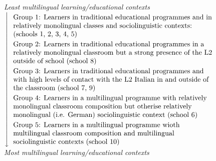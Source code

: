 \documentclass[varwidth]{standalone}
\begin{document}
	\textit{Least multilingual learning/educational contexts}\\
	$
	\left\downarrow {\def\arraystretch{1.2}\begin{tabular}{>{\raggedright\arraybackslash}p{10cm}}
			Group 1: Learners in traditional educational programmes and in relatively monolingual classes and sociolinguistic contexts: (schools 1, 2, 3, 4, 5) \\
			Group 2: Learners in traditional educational programmes in a relatively monolingual classroom but a strong presence of the L2 outside of school (school 8) \\
			Group 3: Learners in traditional educational programmes and with high levels of contact with the L2 Italian in and outside of the classroom (school 7, 9) \\
			Group 4: Learners in a multilingual programme with relatively monolingual classroom composition but otherise relatively monolingual (i.e. German) sociolinguistic context (school 6) \\
			Group 5: Learners in a multilingual programme wioth multilingual classroom composition and multilingual sociolinguistic contexts (school 10) \\
	\end{tabular}}\right.
	$\\
	\textit{Most multilingual learning/educational contexts}
\end{document}
